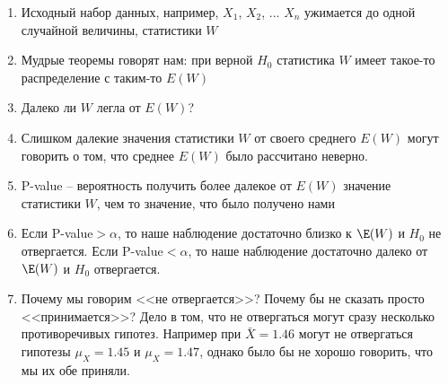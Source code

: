 

\begin{enumerate}
\item Исходный набор данных, например, $X_1$, $X_2$, ... $X_n$ ужимается до одной случайной величины, статистики $W$
\item Мудрые теоремы говорят нам: при верной $H_0$ статистика $W$ имеет такое-то распределение с таким-то $E(W)$
\item Далеко ли $W$ легла от $E(W)$? 
\item Слишком далекие значения статистики $W$ от своего среднего $E(W)$ могут говорить о том, что среднее $E(W)$ было рассчитано неверно.
\item P-value -- вероятность получить более далекое от $E(W)$ значение статистики $W$, чем то значение, что было получено нами
\item Если P-value$>\alpha$, то наше наблюдение достаточно близко к $\E(W)$ и $H_0$ не отвергается. Если P-value$<\alpha$, то наше наблюдение достаточно далеко от $\E(W)$ и $H_0$ отвергается.
\item Почему мы говорим <<не отвергается>>? Почему бы не сказать просто <<принимается>>? Дело в том, что не отвергаться могут сразу несколько противоречивых гипотез. Например при $\bar{X}=1.46$ могут не отвергаться гипотезы $\mu_X=1.45$ и $\mu_X=1.47$, однако было бы не хорошо говорить, что мы их обе приняли.
\end{enumerate}


